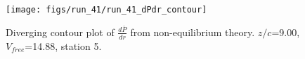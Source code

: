 \begin{figure}[H]
\centering
\texttt{[image: figs/run\_41/run\_41\_dPdr\_contour]}
\caption{Diverging contour plot of $\frac{d\bar{P}}{dr}$ from non-equilibrium theory. $z/c$=9.00, $V_{free}$=14.88, station 5.}
\label{fig:run_41_dPdr_contour}
\end{figure}


